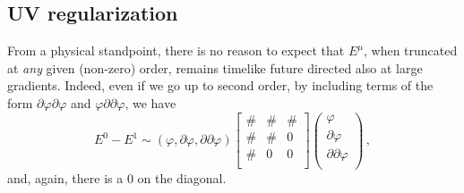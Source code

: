 \documentclass[a4paper, amsfonts, amssymb, amsmath, reprint, showkeys, nofootinbib, twoside,notitlepage,onecolumn,preprintnumbers]{revtex4-2}
\theoremstyle{definition}
\theoremstyle{theorem}
\theoremstyle{corollary}
\begin{document}
\subsection{UV regularization}

From a physical standpoint, there is no reason to expect that $E^\mu$, when truncated at \textit{any} given (non-zero) order, remains timelike future directed also at large gradients. Indeed, even if we go up to second order, by including terms of the form $\partial \varphi \partial \varphi$ and $\varphi \partial \partial \varphi$, we have
\begin{equation}
E^0-E^1 \sim  (\varphi, \partial \varphi, \partial \partial \varphi)
\begin{bmatrix}
\#  &  \# & \# \\
\# &  \# & 0 \\
\# &  0  &  0 \\
\end{bmatrix}
\begin{pmatrix}
\varphi \\
\partial \varphi \\
\partial \partial \varphi\\
\end{pmatrix} \, ,
\end{equation}
and, again, there is a $0$ on the diagonal. 
\end{document}
